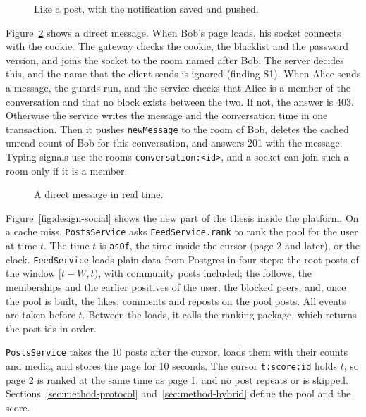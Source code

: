 \begin{figure}[htbp]
  \centering
  \caption{Like a post, with the notification saved and pushed.}
  \label{fig:design-like}
\end{figure}

Figure~\ref{fig:design-dm} shows a direct message. When Bob's page loads, his socket connects with the cookie. The gateway checks the cookie, the blacklist and the password version, and joins the socket to the room named after Bob. The server decides this, and the name that the client sends is ignored (finding S1). When Alice sends a message, the guards run, and the service checks that Alice is a member of the conversation and that no block exists between the two. If not, the answer is 403. Otherwise the service writes the message and the conversation time in one transaction. Then it pushes \texttt{newMessage} to the room of Bob, deletes the cached unread count of Bob for this conversation, and answers 201 with the message. Typing signals use the rooms \texttt{conversation:<id>}, and a socket can join such a room only if it is a member.

\begin{figure}[htbp]
  \centering
  \caption{A direct message in real time.}
  \label{fig:design-dm}
\end{figure}

Figure~\ref{fig:design-social} shows the new part of the thesis inside the platform. On a cache miss, \texttt{PostsService} asks \texttt{FeedService.rank} to rank the pool for the user at time $t$. The time $t$ is \texttt{asOf}, the time inside the cursor (page 2 and later), or the clock. \texttt{FeedService} loads plain data from Postgres in four steps: the root posts of the window $[t - W, t)$, with community posts included; the follows, the memberships and the earlier positives of the user; the blocked peers; and, once the pool is built, the likes, comments and reposts on the pool posts. All events are taken before $t$. Between the loads, it calls the ranking package, which returns the post ids in order.

\texttt{PostsService} takes the 10 posts after the cursor, loads them with their counts and media, and stores the page for 10 seconds. The cursor \texttt{t:score:id} holds $t$, so page 2 is ranked at the same time as page 1, and no post repeats or is skipped. Sections~\ref{sec:method-protocol} and~\ref{sec:method-hybrid} define the pool and the score.


